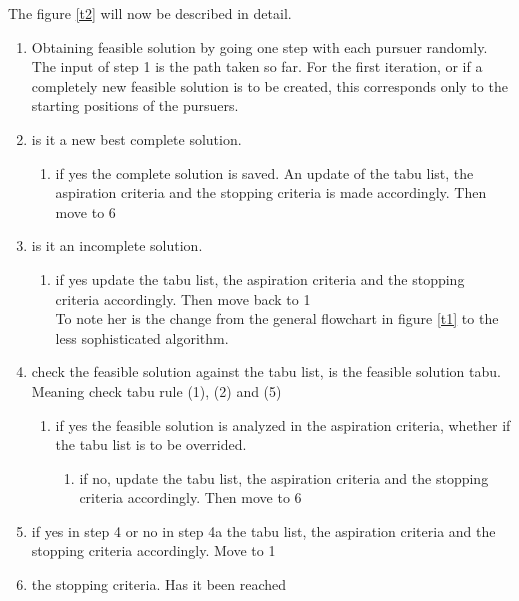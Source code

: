 The figure \ref{t2} will now be described in detail.
\begin{enumerate}
\item{}Obtaining feasible solution by going one step with each pursuer randomly. \vspace{0,1cm}\\ 
The input of step 1 is the path taken so far. For the first iteration, or if a completely new feasible solution is to be created, this corresponds only to the starting positions of the pursuers. 
\item{} is it a new best complete solution.
\begin{enumerate}
\item{} if yes the complete solution is saved. An update of the tabu list, the aspiration criteria and the stopping criteria is made accordingly. Then move to 6
\end{enumerate}
\item{} is it an incomplete solution.
\begin{enumerate}
\item{} if yes update the tabu list, the aspiration criteria and the stopping criteria accordingly. Then move back to 1 \vspace{0,1cm}\\
To note her is the change from the general flowchart in figure \ref{t1} to the less sophisticated algorithm. 
\end{enumerate}
\item{} check the feasible solution against the tabu list, is the feasible solution tabu. \vspace{0,1cm}\\
Meaning check tabu rule (1), (2) and (5)
\begin{enumerate}
\item{} if yes the feasible solution is analyzed in the aspiration criteria, whether if the tabu list is to be overrided.
 \begin{enumerate}
\item{} if no, update the tabu list, the aspiration criteria and the stopping criteria accordingly. Then move to 6
\end{enumerate}
\end{enumerate}
\item{} if yes in step 4 or no in step 4a the tabu list, the aspiration criteria and the stopping criteria accordingly. Move to 1
\item{} the stopping criteria. Has it been reached \vspace{0,1cm}\\

\end{enumerate}
